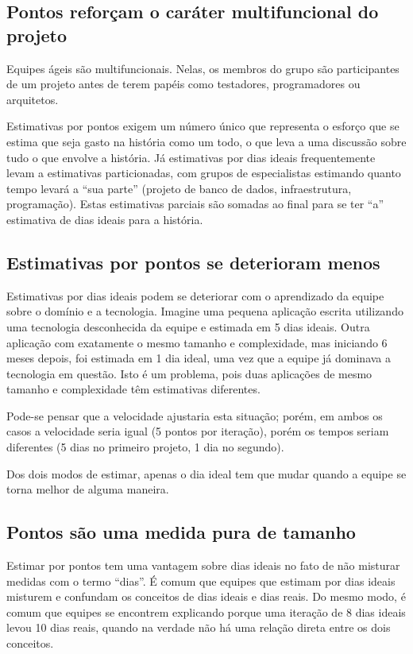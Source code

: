 \documentclass[a4paper,abntfigtabnum,noindentfirst]{abnt}
\begin{document}
\subsection{Pontos reforçam o caráter multifuncional do projeto}

Equipes ágeis são multifuncionais. Nelas, os membros do grupo são participantes de um projeto antes de terem papéis como testadores, programadores ou arquitetos.

Estimativas por pontos exigem um número único que representa o esforço que se estima que seja gasto na história como um todo, o que leva a uma discussão sobre tudo o que envolve a história. Já estimativas por dias ideais frequentemente levam a estimativas particionadas, com grupos de especialistas estimando quanto tempo levará a ``sua parte'' (projeto de banco de dados, infraestrutura, programação). Estas estimativas parciais são somadas ao final para se ter ``a'' estimativa de dias ideais para a história.

\subsection{Estimativas por pontos se deterioram menos}

Estimativas por dias ideais podem se deteriorar com o aprendizado da equipe sobre o domínio e a tecnologia. Imagine uma pequena aplicação escrita utilizando uma tecnologia desconhecida da equipe e estimada em 5 dias ideais. Outra aplicação com exatamente o mesmo tamanho e complexidade, mas iniciando 6 meses depois, foi estimada em 1 dia ideal, uma vez que a equipe já dominava a tecnologia em questão. Isto é um problema, pois duas aplicações de mesmo tamanho e complexidade têm estimativas diferentes.

Pode-se pensar que a velocidade ajustaria esta situação; porém, em ambos os casos a velocidade seria igual (5 pontos por iteração), porém os tempos seriam diferentes (5 dias no primeiro projeto, 1 dia no segundo).

Dos dois modos de estimar, apenas o dia ideal tem que mudar quando a equipe se torna melhor de alguma maneira.


\subsection{Pontos são uma medida pura de tamanho}

Estimar por pontos tem uma vantagem sobre dias ideais no fato de não misturar medidas com o termo ``dias''. É comum que equipes que estimam por dias ideais misturem e confundam os conceitos de dias ideais e dias reais. Do mesmo modo, é comum que equipes se encontrem explicando porque uma iteração de 8 dias ideais levou 10 dias reais, quando na verdade não há uma relação direta entre os dois conceitos.
\end{document}
